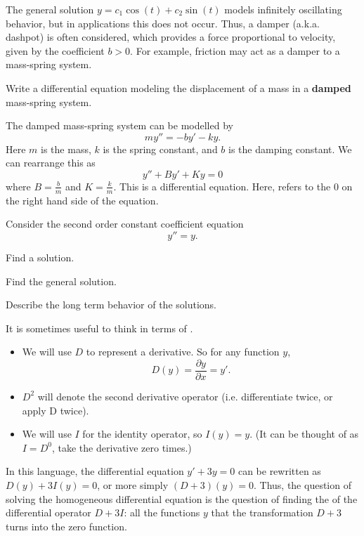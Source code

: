 \begin{applicationActivities}
\begin{activity}{5}
The general solution \(y=c_1\cos(t)+c_2\sin(t)\) models infinitely oscillating behavior,
but in applications this does not occur.
\vfill
Thus, a damper (a.k.a. dashpot) is often considered, which provides a force proportional to
velocity, given by the coefficient \(b>0\). For example, friction may act as a damper to a mass-spring system. 
\begin{center}
\springmassdamper
\end{center}
\vfill
Write a differential equation modeling the displacement of a mass in a \textbf{damped} mass-spring system.
\vfill
\end{activity}

\begin{observation}
The damped mass-spring system can be modelled by
\[my''=-by'-ky.\]
Here \(m\) is the mass, \(k\) is the spring constant, and \(b\) is the damping constant.  We can rearrange this as
\[y''+By'+Ky=0\]
where \(B=\frac{b}{m}\) and \(K=\frac{k}{m}\).
\vfill
This is a   differential equation.
Here,  refers to the \(0\) on the right hand side of the equation.
\end{observation}

\begin{activity}{15}
Consider the second order constant coefficient equation \[y''=y.\]
\begin{subactivity}
Find a solution.
\end{subactivity}
\begin{subactivity}
Find the general solution.
\end{subactivity}
\begin{subactivity}
Describe the long term behavior of the solutions.
\end{subactivity}
\end{activity}

\begin{observation}
It is sometimes useful to think in terms of .
\begin{itemize}
\item We will use \(D\) to represent a derivative.%
  So for any function \(y\),  \[D(y)=\frac{\partial y}{\partial x}=y'.\]
\item \(D^2\) will denote the second derivative operator (i.e. differentiate twice, or apply D twice).
\item We will use \(I\) for the identity operator, so \(I(y)=y\).  
  (It can be thought of as \(I=D^0\), take the derivative zero times.)
\end{itemize}
\vfill
In this language, the differential equation \(y'+3y=0\) can be rewritten as \(D(y)+3I(y)=0\), 
or more simply \( (D+3)(y)=0\).
\vfill
Thus, the question of solving the homogeneous differential equation is the question of finding the 
 of the differential operator \(D+3I\): all the functions \(y\) that the transformation
\(D+3\) turns into the zero function.
\end{observation}


\end{applicationActivities}
